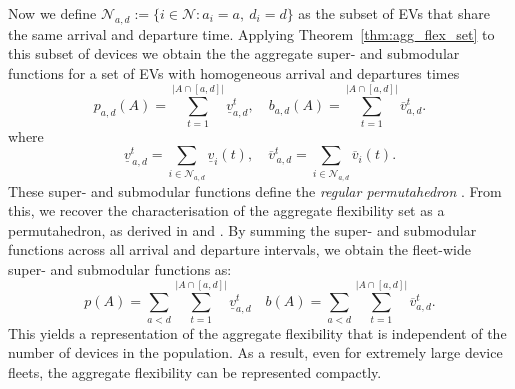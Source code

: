 Now we define $ \mathcal{N}_{a,d} := \{i\in\mathcal{N} : a_i = a,\ d_i = d\}$ as the subset of EVs that share the same arrival and departure time. 
Applying Theorem~\ref{thm:agg_flex_set} to this subset of devices we obtain the the aggregate super- and submodular functions for a set of EVs with homogeneous arrival and departures times
\begin{equation*}
  p_{a,d}(A) = \sum_{t=1}^{\lvert A\cap [a,d]|} \underline v_{a,d}^t,
  \quad
  b_{a,d}(A) = \sum_{t=1}^{\lvert A\cap [a,d]|} \overline v_{a,d}^t.
\end{equation*}
where
\[
  \underline v_{\,a,d}^t = \sum_{i\in\mathcal{N}_{a,d}} \underline v_i(t),
  \quad
  \overline v_{\,a,d}^t=\sum_{i\in\mathcal{N}_{a,d}} \overline v_i(t).
\]
These super- and submodular functions define the \textit{regular permutahedron} \cite{Postnikov2009PermutohedraBeyond}. From this, we recover the characterisation of the aggregate flexibility set as a permutahedron, as derived in \cite{Mukhi2023AnVehicles} and \cite{Panda2024EfficientVehicles}. By summing the super- and submodular functions across all arrival and departure intervals, we obtain the fleet-wide super- and submodular functions as:
\begin{equation}\label{eq:V1G_aggregate_permutahedra}
    p(A) = \sum_{a < d}\sum_{t=1}^{\lvert A\cap [a,d]|} \underline v_{a,d}^t
    \quad
    b(A) = \sum_{a < d}\sum_{t=1}^{\lvert A\cap [a,d]|} \overline v_{a,d}^t.
\end{equation}
This yields a representation of the  aggregate flexibility that is independent of the number of devices in the population. As a result, even for extremely large device fleets, the aggregate flexibility can be represented compactly.


